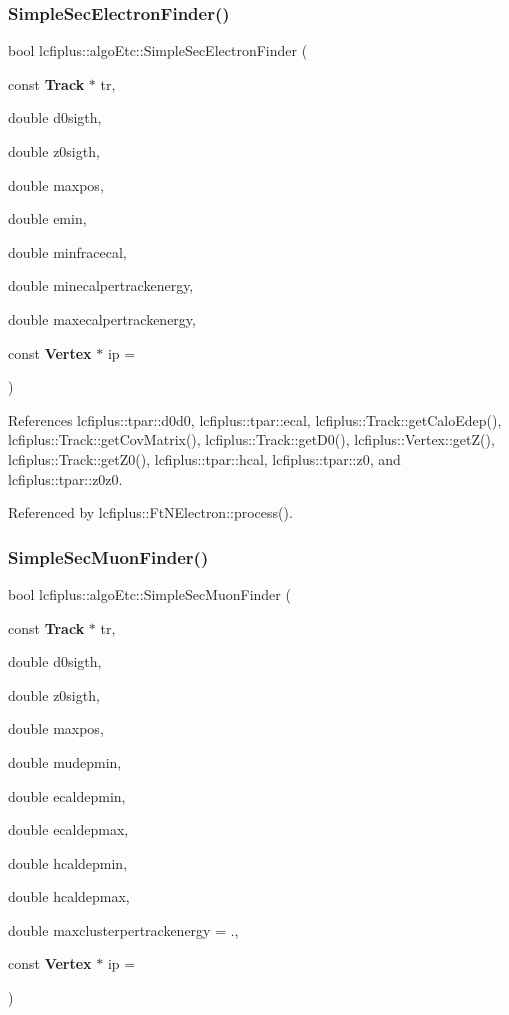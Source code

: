 \subsubsection{Simple\+Sec\+Electron\+Finder()}
{\footnotesize\ttfamily bool lcfiplus\+::algo\+Etc\+::\+Simple\+Sec\+Electron\+Finder (\begin{DoxyParamCaption}\item[{const \textbf{ Track} $\ast$}]{tr,  }\item[{double}]{d0sigth,  }\item[{double}]{z0sigth,  }\item[{double}]{maxpos,  }\item[{double}]{emin,  }\item[{double}]{minfracecal,  }\item[{double}]{minecalpertrackenergy,  }\item[{double}]{maxecalpertrackenergy,  }\item[{const \textbf{ Vertex} $\ast$}]{ip = {} }\end{DoxyParamCaption})}



References lcfiplus\+::tpar\+::d0d0, lcfiplus\+::tpar\+::ecal, lcfiplus\+::\+Track\+::get\+Calo\+Edep(), lcfiplus\+::\+Track\+::get\+Cov\+Matrix(), lcfiplus\+::\+Track\+::get\+D0(), lcfiplus\+::\+Vertex\+::get\+Z(), lcfiplus\+::\+Track\+::get\+Z0(), lcfiplus\+::tpar\+::hcal, lcfiplus\+::tpar\+::z0, and lcfiplus\+::tpar\+::z0z0.



Referenced by lcfiplus\+::\+Ft\+N\+Electron\+::process().

\mbox{\label{namespacelcfiplus_1_1algoEtc_a14bff996c096faffbc15115b9e921d0e}} 
\subsubsection{Simple\+Sec\+Muon\+Finder()}
{\footnotesize\ttfamily bool lcfiplus\+::algo\+Etc\+::\+Simple\+Sec\+Muon\+Finder (\begin{DoxyParamCaption}\item[{const \textbf{ Track} $\ast$}]{tr,  }\item[{double}]{d0sigth,  }\item[{double}]{z0sigth,  }\item[{double}]{maxpos,  }\item[{double}]{mudepmin,  }\item[{double}]{ecaldepmin,  }\item[{double}]{ecaldepmax,  }\item[{double}]{hcaldepmin,  }\item[{double}]{hcaldepmax,  }\item[{double}]{maxclusterpertrackenergy = {.},  }\item[{const \textbf{ Vertex} $\ast$}]{ip = {} }\end{DoxyParamCaption})}



